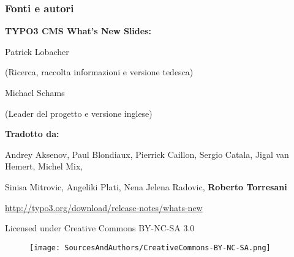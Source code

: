 \begin{frame}[fragile]
	\frametitle{Fonti e autori}

	\vspace{-0.6cm}

	\centerline{\textbf{TYPO3 CMS What's New Slides:}}

	\begin{center}
		\smaller
			\centerline{Patrick Lobacher}
			\centerline{(Ricerca, raccolta informazioni e versione tedesca)}
			\vspace{0.1cm}
			\centerline{Michael Schams}
			\centerline{(Leader del progetto e versione inglese)}
		\normalsize
	\end{center}
	\vspace{-0.6cm}
	\begin{center}
		\smaller
			\centerline{\textbf{Tradotto da:}}
			\centerline{Andrey Aksenov, Paul Blondiaux, Pierrick Caillon, Sergio Catala, Jigal van Hemert, Michel Mix,}
			\centerline{Sinisa Mitrovic, Angeliki Plati, Nena Jelena Radovic, \textbf{Roberto Torresani}}
		\normalsize
	\end{center}
	\vspace{-0.6cm}
	\smaller\begin{center}\url{http://typo3.org/download/release-notes/whats-new}\end{center}\normalsize

	\smaller\begin{center}Licensed under Creative Commons BY-NC-SA 3.0\end{center}\normalsize
	\begin{figure}\vspace*{-0.3cm}
		\texttt{[image: SourcesAndAuthors/CreativeCommons-BY-NC-SA.png]}
	\end{figure}

\end{frame}

